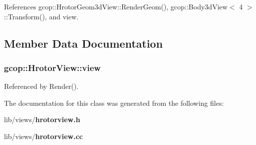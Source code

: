 \-References gcop\-::\-Hrotor\-Geom3d\-View\-::\-Render\-Geom(), gcop\-::\-Body3d\-View$<$ 4 $>$\-::\-Transform(), and view.



\subsection{\-Member \-Data \-Documentation}
\subsubsection[{view}]{ {\bf gcop\-::\-Hrotor\-View\-::view}}\label{classgcop_1_1HrotorView_a89be654bcdc25f1cd51ae93745f25c5b}


\-Referenced by \-Render().



\-The documentation for this class was generated from the following files\-:\begin{DoxyCompactItemize}
\item 
lib/views/{\bf hrotorview.\-h}\item 
lib/views/{\bf hrotorview.\-cc}\end{DoxyCompactItemize}

